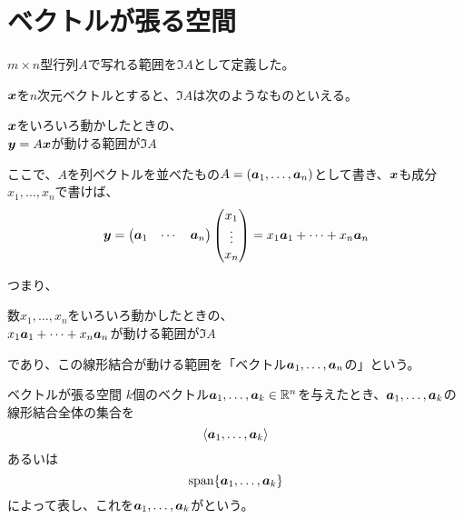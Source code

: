 \documentclass[../../../topic_linear-algebra]{subfiles}
\begin{document}
\sectionline
\section{ベクトルが張る空間}\label{sec:span-of-vectors}

$m \times n$型行列$A$で写れる範囲を$\Im A$として定義した。

$\vb*{x}$を$n$次元ベクトルとすると、$\Im A$は次のようなものといえる。
\begin{emphabox}
  \begin{spacebox}
    \begin{center}
      $\vb*{x}$をいろいろ動かしたときの、\\
      $\vb*{y} = A\vb*{x}$が動ける範囲が$\Im A$
    \end{center}
  \end{spacebox}
\end{emphabox}

ここで、$A$を列ベクトルを並べたもの$A= (\vb*{a}_1,\ldots, \vb*{a}_n)$として書き、$\vb*{x}$も成分$x_1,\ldots,x_n$で書けば、
\begin{equation*}
  \vb*{y} = \begin{pmatrix}
    \vb*{a}_1 & \cdots & \vb*{a}_n
  \end{pmatrix} \begin{pmatrix}
    x_1    \\
    \vdots \\
    x_n
  \end{pmatrix}
  = x_1 \vb*{a}_1 + \cdots + x_n \vb*{a}_n
\end{equation*}

つまり、
\begin{emphabox}
  \begin{spacebox}
    \begin{center}
      数$x_1, \ldots, x_n$をいろいろ動かしたときの、\\
      $x_1 \vb*{a}_1 + \cdots + x_n \vb*{a}_n$が動ける範囲が$\Im A$
    \end{center}
  \end{spacebox}
\end{emphabox}
であり、この線形結合が動ける範囲を「ベクトル$\vb*{a}_1, \ldots, \vb*{a}_n$の」という。

\begin{definition}{ベクトルが張る空間}\label{def:span-of-vectors}
  $k$個のベクトル$\vb*{a}_1, \dots, \vb*{a}_k \in \mathbb{R}^n$を与えたとき、$\vb*{a}_1, \dots, \vb*{a}_k$の線形結合全体の集合を
  \begin{equation*}
    \langle \vb*{a}_1, \dots, \vb*{a}_k \rangle
  \end{equation*}
  あるいは
  \begin{equation*}
    \operatorname{span}\{\vb*{a}_1, \dots, \vb*{a}_k\}
  \end{equation*}
  によって表し、これを$\vb*{a}_1, \dots, \vb*{a}_k$がという。
\end{definition}
\end{document}

